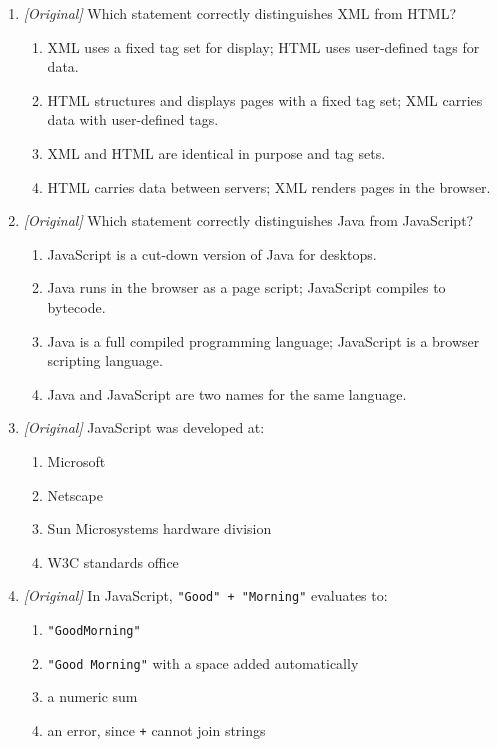 \documentclass[11pt]{article}
\begin{document}
\begin{enumerate}[label=\textbf{Q\arabic*.}, leftmargin=*]
\begin{enumerate}[label=\Alph*.]
    \item a compiled language for desktop applications
  \end{enumerate}
\item \textit{[Original]} Which statement correctly distinguishes XML from HTML?
  \begin{enumerate}[label=\Alph*.]
    \item XML uses a fixed tag set for display; HTML uses user-defined tags for data.
    \item HTML structures and displays pages with a fixed tag set; XML carries data with user-defined tags.
    \item XML and HTML are identical in purpose and tag sets.
    \item HTML carries data between servers; XML renders pages in the browser.
  \end{enumerate}
\item \textit{[Original]} Which statement correctly distinguishes Java from
  JavaScript?
  \begin{enumerate}[label=\Alph*.]
    \item JavaScript is a cut-down version of Java for desktops.
    \item Java runs in the browser as a page script; JavaScript compiles to bytecode.
    \item Java is a full compiled programming language; JavaScript is a browser scripting language.
    \item Java and JavaScript are two names for the same language.
  \end{enumerate}
\item \textit{[Original]} JavaScript was developed at:
  \begin{enumerate}[label=\Alph*.]
    \item Microsoft
    \item Netscape
    \item Sun Microsystems hardware division
    \item W3C standards office
  \end{enumerate}
\item \textit{[Original]} In JavaScript, \texttt{"Good" + "Morning"} evaluates to:
  \begin{enumerate}[label=\Alph*.]
    \item \texttt{"GoodMorning"}
    \item \texttt{"Good Morning"} with a space added automatically
    \item a numeric sum
    \item an error, since \texttt{+} cannot join strings

\end{enumerate}
\end{enumerate}
\end{document}
